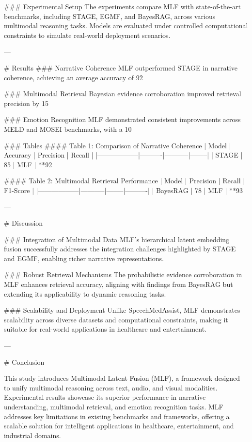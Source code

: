 ### Experimental Setup
The experiments compare MLF with state-of-the-art benchmarks, including STAGE, EGMF, and BayesRAG, across various multimodal reasoning tasks. Models are evaluated under controlled computational constraints to simulate real-world deployment scenarios.

---

# Results
### Narrative Coherence
MLF outperformed STAGE in narrative coherence, achieving an average accuracy of 92%

### Multimodal Retrieval
Bayesian evidence corroboration improved retrieval precision by 15%

### Emotion Recognition
MLF demonstrated consistent improvements across MELD and MOSEI benchmarks, with a 10%

### Tables
#### Table 1: Comparison of Narrative Coherence
| Model           | Accuracy | Precision | Recall |
|------------------|----------|-----------|--------|
| STAGE           | 85%
| MLF             | **92%

#### Table 2: Multimodal Retrieval Performance
| Model           | Precision | Recall | F1-Score |
|------------------|-----------|--------|----------|
| BayesRAG        | 78%
| MLF             | **93%

---

# Discussion

### Integration of Multimodal Data
MLF's hierarchical latent embedding fusion successfully addresses the integration challenges highlighted by STAGE and EGMF, enabling richer narrative representations.

### Robust Retrieval Mechanisms
The probabilistic evidence corroboration in MLF enhances retrieval accuracy, aligning with findings from BayesRAG but extending its applicability to dynamic reasoning tasks.

### Scalability and Deployment
Unlike SpeechMedAssist, MLF demonstrates scalability across diverse datasets and computational constraints, making it suitable for real-world applications in healthcare and entertainment.

---

# Conclusion

This study introduces Multimodal Latent Fusion (MLF), a framework designed to unify multimodal reasoning across text, audio, and visual modalities. Experimental results showcase its superior performance in narrative understanding, multimodal retrieval, and emotion recognition tasks. MLF addresses key limitations in existing benchmarks and frameworks, offering a scalable solution for intelligent applications in healthcare, entertainment, and industrial domains.

